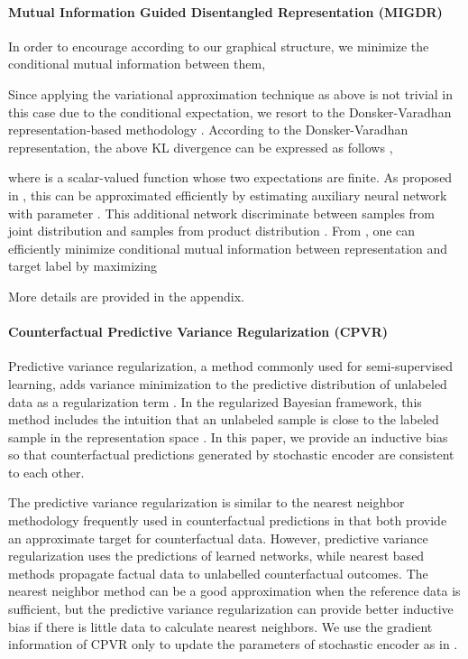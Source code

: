 \documentclass{article}
\begin{document}
\paragraph{Mutual Information Guided Disentangled Representation (MIGDR)}

In order to encourage  according to our graphical structure, we minimize the conditional mutual information between them,
    
    Since applying the variational approximation technique as above is not trivial in this case due to the conditional expectation, we resort to the Donsker-Varadhan representation-based methodology \cite{MD1983}. According to the Donsker-Varadhan representation, the above KL divergence can be expressed as follows \cite{Belghazi18},
    
    where  is a scalar-valued function whose two expectations are finite. As proposed in \cite{Belghazi18}, this can be approximated efficiently by estimating auxiliary neural network  with parameter . This additional network discriminate between samples from joint distribution  and samples from product distribution . From , one can efficiently minimize conditional mutual information between representation  and target label  by maximizing
    
    More details are provided in the appendix.

\paragraph{Counterfactual Predictive Variance Regularization (CPVR)}

Predictive variance regularization, a method commonly used for semi-supervised learning, adds variance minimization to the predictive distribution of unlabeled data as a regularization term \cite{jean2018semi}. In the regularized Bayesian framework, this method includes the intuition that an unlabeled sample is close to the labeled sample in the representation space \cite{Alaa17, jean2018semi}. In this paper, we provide an inductive bias so that counterfactual predictions generated by stochastic encoder are consistent to each other.
    
    The predictive variance regularization is similar to the nearest neighbor methodology frequently used in counterfactual predictions \cite{johansson16, chang2017informative, li2017matching} in that both  provide an approximate target for counterfactual data. However, predictive variance regularization uses the predictions of learned networks, while nearest based methods propagate factual data to unlabelled counterfactual outcomes. The nearest neighbor method can be a good approximation when the reference data is sufficient, but the predictive variance regularization can provide better inductive bias if there is little data to calculate nearest neighbors. We use the gradient information of CPVR only to update the parameters of stochastic encoder as in \cite{Alaa17, jean2018semi}.
    
\end{document}
